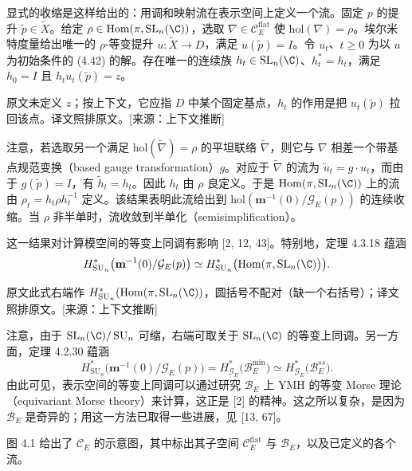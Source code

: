 显式的收缩是这样给出的：用调和映射流在表示空间上定义一个流。固定 $p$ 的提升 $\tilde p\in\widetilde X$。给定 $\rho\in\operatorname{Hom}(\pi,\operatorname{SL}_n(\C))$，选取 $\nabla\in\mathcal{C}^{\mathrm{flat}}_E$ 使 $\mathrm{hol}(\nabla)=\rho$。埃尔米特度量给出唯一的 $\rho$-等变提升 $u\colon\widetilde X\to D$，满足 $u(\tilde p)=I$。令 $u_t$、$t\ge0$ 为以 $u$ 为初始条件的 (4.42) 的解。存在唯一的连续族 $h_t\in\operatorname{SL}_n(\C)$、$h_t^*=h_t$，满足 $h_0=I$ 且 $h_tu_t(\tilde p)=z$。\begin{annote}原文未定义 $z$；按上下文，它应指 $D$ 中某个固定基点，$h_t$ 的作用是把 $u_t(\tilde p)$ 拉回该点。译文照排原文。[来源：上下文推断]\end{annote}注意，若选取另一个满足 $\mathrm{hol}(\tilde\nabla)=\rho$ 的平坦联络 $\tilde\nabla$，则它与 $\nabla$ 相差一个带基点规范变换（based gauge transformation）$g$。对应于 $\tilde\nabla$ 的流为 $\tilde u_t=g\cdot u_t$，而由于 $g(\tilde p)=I$，有 $\tilde h_t=h_t$。因此 $h_t$ 由 $\rho$ 良定义。于是 $\operatorname{Hom}(\pi,\operatorname{SL}_n(\C))$ 上的流由 $\rho_t=h_t\rho h_t^{-1}$ 定义。该结果表明此流给出到 $\mathrm{hol}(\mathbf{m}^{-1}(0)/\mathcal{G}_E(p))$ 的连续收缩。当 $\rho$ 非半单时，流收敛到半单化（semisimplification）。

这一结果对计算模空间的等变上同调有影响 [2, 12, 43]。特别地，定理 4.3.18 蕴涵
\[
H^*_{\operatorname{SU}_n}\bigl(\mathbf{m}^{-1}(0)/\mathcal{G}_E(p)\bigr)\simeq H^*_{\operatorname{SU}_n}\bigl(\operatorname{Hom}(\pi,\operatorname{SL}_n(\C)\bigr)\bigr).
\]\begin{annote}原文此式右端作 $H^*_{\operatorname{SU}_n}(\operatorname{Hom}(\pi,\operatorname{SL}_n(\C))$，圆括号不配对（缺一个右括号）；译文照排原文。[来源：上下文推断]\end{annote}
注意，由于 $\operatorname{SL}_n(\C)/\operatorname{SU}_n$ 可缩，右端可取关于 $\operatorname{SL}_n(\C)$ 的等变上同调。另一方面，定理 4.2.30 蕴涵
\[
H^*_{\operatorname{SU}_n}\bigl(\mathbf{m}^{-1}(0)/\mathcal{G}_E(p)\bigr)=H^*_{\mathcal{G}_E}\bigl(\mathcal{B}^{\min}_E\bigr)\simeq H^*_{\mathcal{G}_E}\bigl(\mathcal{B}^{ss}_E\bigr).
\]
由此可见，表示空间的等变上同调可以通过研究 $\mathcal{B}_E$ 上 YMH 的等变 Morse 理论（equivariant Morse theory）来计算，这正是 [2] 的精神。这之所以复杂，是因为 $\mathcal{B}_E$ 是奇异的；用这一方法已取得一些进展，见 [13, 67]。

图 4.1 给出了 $\mathcal{C}_E$ 的示意图，其中标出其子空间 $\mathcal{C}^{\mathrm{flat}}_E$ 与 $\mathcal{B}_E$，以及已定义的各个流。

